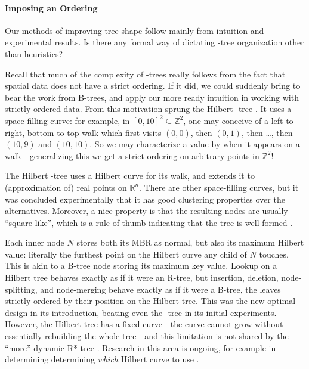 \paragraph{Imposing an Ordering}
Our methods of improving tree-shape follow mainly from intuition and experimental results.
Is there any formal way of dictating \rbase-tree organization other than heuristics?

Recall that much of the complexity of \rbase-trees really follows from the fact that spatial data does not have a strict ordering.
If it did, we could suddenly bring to bear the work from B-trees, and apply our more ready intuition in working with strictly ordered data.
From this motivation sprung the Hilbert \rbase-tree \cite{kamelfaloutsos94}.
It uses a space-filling curve:
for example, in $[0,10]^2\subseteq\mathbb Z^2$, one may conceive of a left-to-right, bottom-to-top walk which first visits $(0,0)$, then $(0,1)$, then \ldots, then $(10,9)$ and $(10,10)$.
So we may characterize a value by when it appears on a walk---generalizing this we get a strict ordering on arbitrary points in $\mathbb Z^2$!

The Hilbert \rbase-tree uses a Hilbert curve for its walk, and extends it to (approximation of) real points on $\mathbb R^n$.
There are other space-filling curves, but it was concluded experimentally that it has good clustering properties \cite{kamelfaloutsos94} over the alternatives.
Moreover, a nice property is that the resulting nodes are usually ``square-like'', which is a rule-of-thumb indicating that the tree is well-formed \cite{kamelfaloutsos94,theodoridissellis96}.

Each inner node $N$ stores both its MBR as normal, but also its maximum Hilbert value: literally the furthest point on the Hilbert curve any child of $N$ touches.
This is akin to a B-tree node storing its maximum key value.
Lookup on a Hilbert tree behaves exactly as if it were an R-tree, but insertion, deletion, node-splitting, and node-merging behave exactly as if it were a B-tree, the leaves strictly ordered by their position on the Hilbert tree.
This was the new optimal design in its introduction, beating even the \rstar-tree in its initial experiments.
However, the Hilbert tree has a fixed curve---the curve cannot grow without essentially rebuilding the whole tree---and this limitation is not shared by the ``more'' dynamic R* tree \cite{beckmannseeger09}.
Research in this area is ongoing, for example in determining determining \emph{which} Hilbert curve to use \cite{haverkortwalderveen11}.

